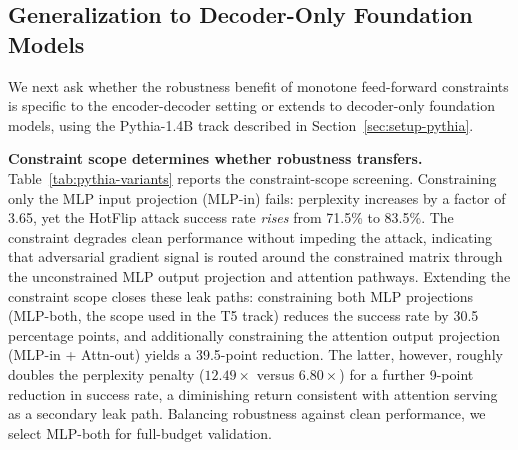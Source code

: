 \documentclass{article}
\theoremstyle{plain}
\theoremstyle{definition}
\theoremstyle{remark}
\begin{document}
\subsection{Generalization to Decoder-Only Foundation Models}
\label{sec:results-pythia}

We next ask whether the robustness benefit of monotone feed-forward constraints is specific to the encoder-decoder setting or extends to decoder-only foundation models, using the Pythia-1.4B track described in Section~\ref{sec:setup-pythia}.

\textbf{Constraint scope determines whether robustness transfers.}
Table~\ref{tab:pythia-variants} reports the constraint-scope screening. Constraining only the MLP input projection (MLP-in) fails: perplexity increases by a factor of 3.65, yet the HotFlip attack success rate \emph{rises} from 71.5\% to 83.5\%.
The constraint degrades clean performance without impeding the attack, indicating that adversarial gradient signal is routed around the constrained matrix through the unconstrained MLP output projection and attention pathways. Extending the constraint scope closes these leak paths: constraining both MLP projections (MLP-both, the scope used in the T5 track) reduces the success rate by 30.5 percentage points, and additionally constraining the attention output projection (MLP-in + Attn-out) yields a 39.5-point reduction. The latter, however, roughly doubles the perplexity penalty ($12.49\times$ versus $6.80\times$) for a further 9-point reduction in success rate, a diminishing return consistent with attention serving as a secondary leak path. Balancing robustness against clean performance, we select MLP-both for full-budget validation.

\begin{table}[t]
\caption{Constraint-scope screening on Pythia-1.4B (seed = 42). PPL denotes held-out Pile perplexity; SR denotes HotFlip attack success rate ($n = 200$, 10 flips, 15\% threshold), and SR drop its reduction in percentage points (pp). MLP-in was screened under the full training budget, the other scopes under a reduced budget.}
\label{tab:pythia-variants}
\vskip 0.1in
\centering
{}
\vskip -0.1in
\end{table}
\end{document}
